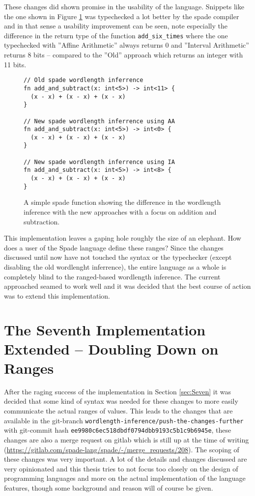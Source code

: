 \documentclass[msc,lith,english]{liuthesis}
\begin{document}
These changes did shown promise in the usability of the language. Snippets like the one shown in Figure \ref{fig:CodeThatWorksNow} was typechecked a lot better by the spade compiler and in that sense a usability improvement can be seen, note especially the difference in the return type of the function \verb+add_six_times+ where the one typechecked with ''Affine Arithmetic'' always returns 0 and ''Interval Arithmetic'' returns 8 bits -- compared to the ''Old'' approach which returns an integer with 11 bits. %

\begin{figure}
\begin{verbatim}
// Old spade wordlength inferrence
fn add_and_subtract(x: int<5>) -> int<11> {
  (x - x) + (x - x) + (x - x)
}

// New spade wordlength inferrence using AA
fn add_and_subtract(x: int<5>) -> int<0> {
  (x - x) + (x - x) + (x - x)
}

// New spade wordlength inferrence using IA
fn add_and_subtract(x: int<5>) -> int<8> {
  (x - x) + (x - x) + (x - x)
}
\end{verbatim}
  \caption{A simple spade function showing the difference in the wordlength inference with the new approaches with a focus on addition and subtraction.}
  \label{fig:CodeThatWorksNow}
\end{figure}

This implementation leaves a gaping hole roughly the size of an elephant. How does a user of the Spade language define these ranges? Since the changes discussed until now have not touched the syntax or the typechecker (except disabling the old wordlenght inferrence), the entire language as a whole is completely blind to the ranged-based wordlength inference. The current approached seamed to work well and it was decided that the best course of action was to extend this implementation.

\section{The Seventh Implementation Extended -- Doubling Down on Ranges}
\label{sec:Seven2}
After the raging success of the implementation in Section \ref{sec:Seven} it was decided that some kind of syntax was needed for these changes to more easily communicate the actual ranges of values. This leads to the changes that are available in the git-branch \verb+wordlength-inference/push-the-changes-further+ with git-commit hash \verb+ee9980c6ec518dbdf0794dbb9193c5b1c9b6945e+, these changes are also a merge request on gitlab which is still up at the time of writing (\url{https://gitlab.com/spade-lang/spade/-/merge_requests/208}). The scoping of these changes was very important. A lot of the details and changes discussed are very opinionated and this thesis tries to not focus too closely on the design of programming languages and more on the actual implementation of the language features, though some background and reason will of course be given. 
\end{document}
